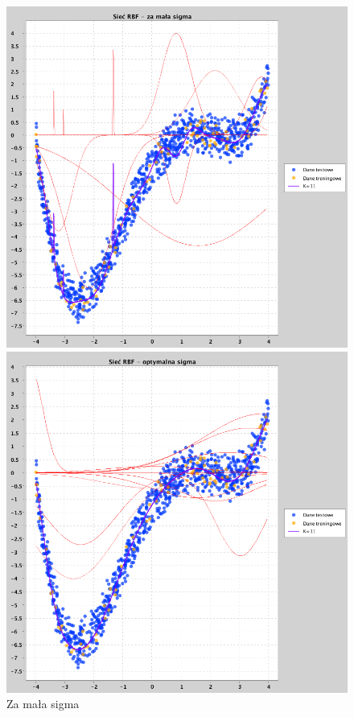 \documentclass[a4paper, portrait,11pt]{article}
\begin{document}
\begin{figure}[!htb]
  \begin{minipage}{0.33\textwidth}
    \centering
    \includegraphics[width=1\linewidth]{../data/approximation3/2/derivatives/small.png}
    \caption{\label{fig:2smallderivative}Za mała sigma}
  \end{minipage}
  \begin{minipage}{0.33\textwidth}
    \centering
    \includegraphics[width=1\linewidth]{../data/approximation3/2/derivatives/optimal.png}

\end{minipage}
\end{figure}
\end{document}
